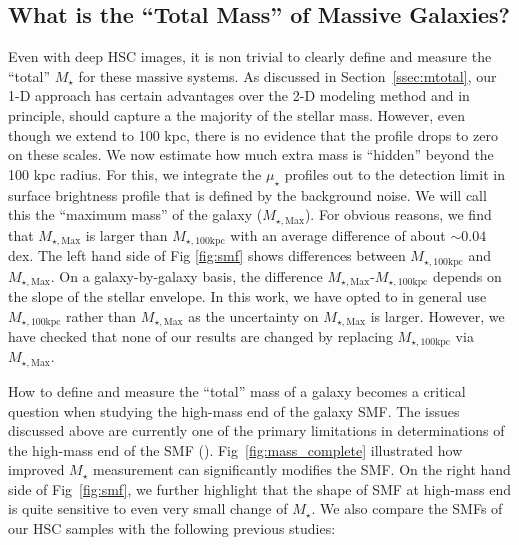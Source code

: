 \documentclass[a4paper,fleqn,usenatbib]{mnras}
\def\mstar{{$M_{\star}$}}
\def\mtot{{$M_{\star,100\mathrm{kpc}}$}}
\def\mmax{{$M_{\star,\mathrm{Max}}$}}
\def\mden{{$\mu_{\star}$}}
\begin{document}


\subsection{What is the ``Total Mass'' of Massive Galaxies?}

    Even with deep HSC images, it is non trivial to clearly define and measure the
    ``total'' \mstar{} for these massive systems. 
    As discussed in Section~\ref{ssec:mtotal}, our 1-D approach has certain advantages 
    over the 2-D modeling method and in principle, should capture a the majority of 
    the stellar mass. 
    However, even though we extend to 100 kpc, there is no evidence that the profile 
    drops to zero on these scales. 
    We now estimate how much extra mass is ``hidden'' beyond the 100 kpc radius. 
    For this, we integrate the \mden{} profiles out to the detection limit in 
    surface brightness profile that is defined by the background noise.
    We will call this the ``maximum mass'' of the galaxy (\mmax{}). 
    For obvious reasons, we find that \mmax{} is larger than \mtot{} with an average 
    difference of about ${\sim}0.04$ dex. 
    The left hand side of Fig \ref{fig:smf} shows differences between \mtot{}
    and \mmax{}. 
    On a galaxy-by-galaxy basis, the difference \mmax{}-\mtot{} depends on the slope 
    of the stellar envelope. 
    In this work, we have opted to in general use \mtot{} rather than \mmax{} as the 
    uncertainty on \mmax{} is larger. 
    However, we have checked that none of our results are changed by replacing \mtot{} 
    via \mmax{}.
        
    How to define and measure the ``total'' mass of a galaxy becomes a critical 
    question when studying the high-mass end of the galaxy SMF. 
    The issues discussed above are currently one of the primary limitations in 
    determinations of the high-mass end of the SMF (\citealt{Bernardi2017}). 
    Fig~\ref{fig:mass_complete} illustrated how improved \mstar{} measurement can 
    significantly modifies the SMF. 
    On the right hand side of Fig~\ref{fig:smf}, we further highlight that 
    the shape of SMF at high-mass end is quite sensitive to even very small 
    change of \mstar{}. 
    We also compare the SMFs of our HSC samples with the following previous studies:
        
\end{document}

